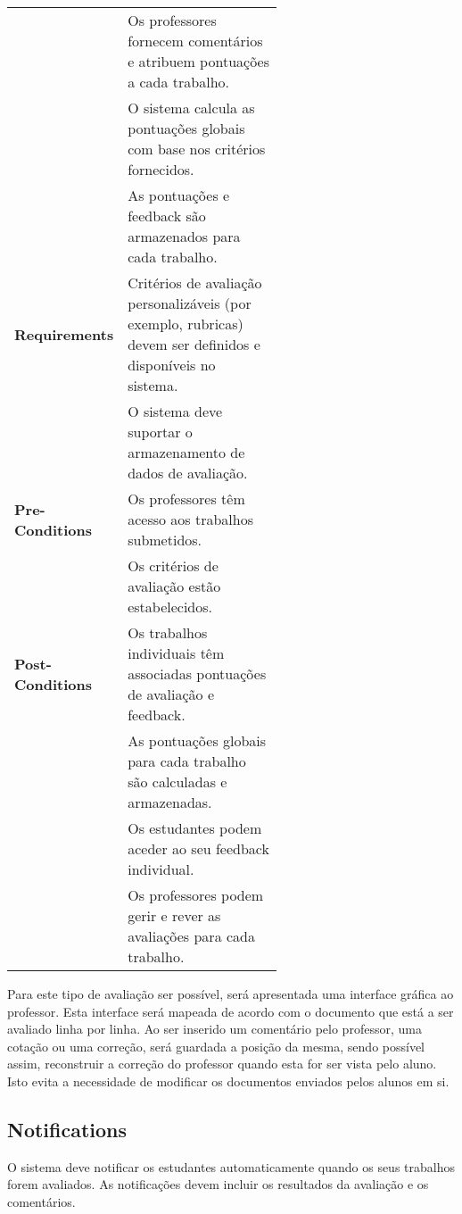 \documentclass[10pt]{article}
\begin{document}
\begin{table}[H]
\begin{tabular}{|l|p{0.6\linewidth}|}
                        & Os professores fornecem comentários e atribuem pontuações a cada trabalho. \\
                        & O sistema calcula as pontuações globais com base nos critérios fornecidos. \\
                        & As pontuações e feedback são armazenados para cada trabalho. \\
                        \hline
        \textbf{Requirements} & Critérios de avaliação personalizáveis (por exemplo, rubricas) devem ser definidos e 
        disponíveis no sistema. \\
                              & O sistema deve suportar o armazenamento de dados de avaliação. \\
                              \hline
        \textbf{Pre-Conditions} & Os professores têm acesso aos trabalhos submetidos. \\
                                & Os critérios de avaliação estão estabelecidos. \\
                                \hline
        \textbf{Post-Conditions} & Os trabalhos individuais têm associadas pontuações de avaliação e feedback. \\
                                 & As pontuações globais para cada trabalho são calculadas e armazenadas. \\
                                 & Os estudantes podem aceder ao seu feedback individual. \\
                                 & Os professores podem gerir e rever as avaliações para cada trabalho. \\
                                 \hline
    \end{tabular}
\end{table}

Para este tipo de avaliação ser possível, será apresentada uma interface gráfica
ao professor.
Esta interface será mapeada de acordo com o documento que está a ser avaliado
linha por linha. Ao ser inserido um comentário pelo professor, uma cotação ou
uma correção, será guardada a posição da mesma, sendo possível assim, reconstruir
a correção do professor quando esta for ser vista pelo aluno. Isto evita a necessidade
de modificar os documentos enviados pelos alunos em si.

\newpage

\subsection{Notifications}
O sistema deve notificar os estudantes automaticamente quando os seus trabalhos forem avaliados. 
As notificações devem incluir os resultados da avaliação e os comentários. 
\end{document}
